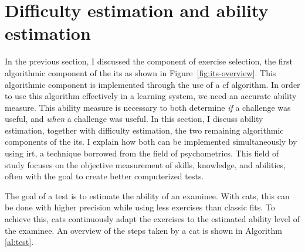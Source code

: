 \section{Difficulty estimation and ability estimation}
\label{sec:calib}



In the previous section, I discussed the component of exercise selection, the first algorithmic component of the \gls{its} as shown in Figure~\ref{fig:its-overview}.
This algorithmic component is implemented through the use of a \gls{cf} algorithm.
In order to use this algorithm effectively in a learning system, we need an accurate ability measure.
This ability measure is necessary to both determine \textit{if} a challenge was useful, and \textit{when} a challenge was useful.
In this section, I discuss ability estimation, together with difficulty estimation, the two remaining algorithmic components of the \gls{its}.
I explain how both can be implemented simultaneously by using \gls{irt}, a technique borrowed from the field of psychometrics.
This field of study focuses on the objective measurement of skills, knowledge, and abilities, often with the goal to create better computerized tests.

The goal of a test is to estimate the ability of an examinee.
With \glspl{cat}, this can be done with higher precision while using less exercises than classic \glspl{fit}.
To achieve this, \glspl{cat} continuously adapt the exercises to the estimated ability level of the examinee.
An overview of the steps taken by a \gls{cat} is shown in Algorithm \ref{al:test}. 

